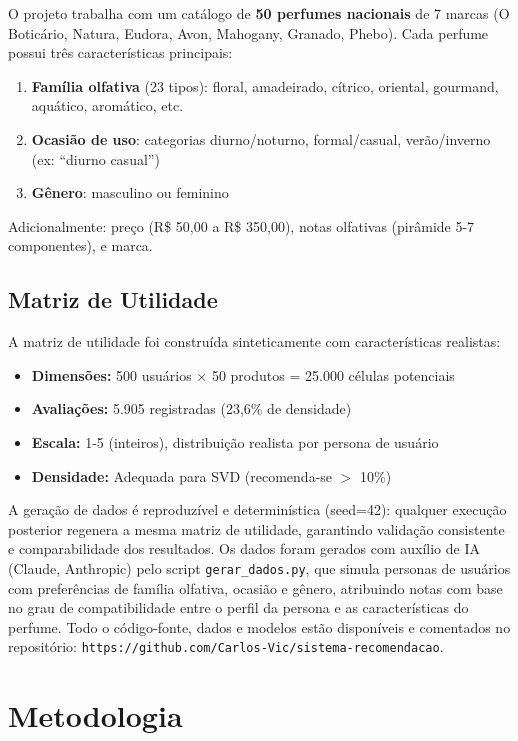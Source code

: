 \documentclass[12pt,a4paper]{article}
\begin{document}
O projeto trabalha com um catálogo de \textbf{50 perfumes nacionais} de 7 marcas (O Boticário, Natura, Eudora, Avon, Mahogany, Granado, Phebo). Cada perfume possui três características principais:

\begin{enumerate}
    \item \textbf{Família olfativa} (23 tipos): floral, amadeirado, cítrico, oriental, gourmand, aquático, aromático, etc.
    \item \textbf{Ocasião de uso}: categorias diurno/noturno, formal/casual, verão/inverno (ex: ``diurno casual'')
    \item \textbf{Gênero}: masculino ou feminino
\end{enumerate}

Adicionalmente: preço (R\$ 50,00 a R\$ 350,00), notas olfativas (pirâmide 5-7 componentes), e marca.

\subsection{Matriz de Utilidade}

A matriz de utilidade foi construída sinteticamente com características realistas:
\begin{itemize}
    \item \textbf{Dimensões:} 500 usuários × 50 produtos = 25.000 células potenciais
    \item \textbf{Avaliações:} 5.905 registradas (23,6\% de densidade)
    \item \textbf{Escala:} 1-5 (inteiros), distribuição realista por persona de usuário
    \item \textbf{Densidade:} Adequada para SVD (recomenda-se $>$ 10\%)
\end{itemize}

A geração de dados é reproduzível e determinística (seed=42): qualquer execução posterior regenera a mesma matriz de utilidade, garantindo validação consistente e comparabilidade dos resultados. Os dados foram gerados com auxílio de IA (Claude, Anthropic) pelo script \texttt{gerar\_dados.py}, que simula personas de usuários com preferências de família olfativa, ocasião e gênero, atribuindo notas com base no grau de compatibilidade entre o perfil da persona e as características do perfume. Todo o código-fonte, dados e modelos estão disponíveis e comentados no repositório: \texttt{https://github.com/Carlos-Vic/sistema-recomendacao}.

\section{Metodologia}
\end{document}

